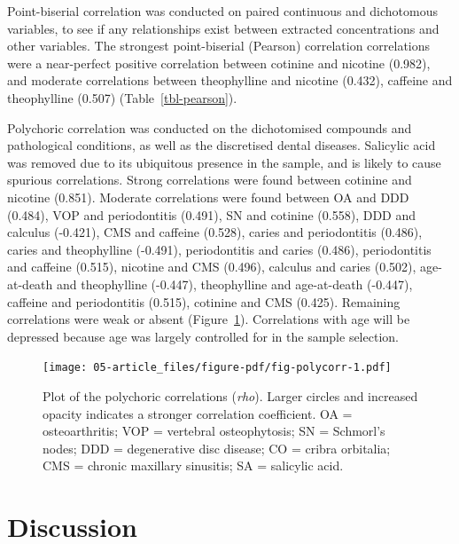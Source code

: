 \documentclass[
  letterpaper,
]{book}
\begin{document}
Point-biserial correlation was conducted on paired continuous and
dichotomous variables, to see if any relationships exist between
extracted concentrations and other variables. The strongest
point-biserial (Pearson) correlation correlations were a near-perfect
positive correlation between cotinine and nicotine (0.982), and moderate
correlations between theophylline and nicotine (0.432), caffeine and
theophylline (0.507) (Table~\ref{tbl-pearson}).

Polychoric correlation was conducted on the dichotomised compounds and
pathological conditions, as well as the discretised dental diseases.
Salicylic acid was removed due to its ubiquitous presence in the sample,
and is likely to cause spurious correlations. Strong correlations were
found between cotinine and nicotine (0.851). Moderate correlations were
found between OA and DDD (0.484), VOP and periodontitis (0.491), SN and
cotinine (0.558), DDD and calculus (-0.421), CMS and caffeine (0.528),
caries and periodontitis (0.486), caries and theophylline (-0.491),
periodontitis and caries (0.486), periodontitis and caffeine (0.515),
nicotine and CMS (0.496), calculus and caries (0.502), age-at-death and
theophylline (-0.447), theophylline and age-at-death (-0.447), caffeine
and periodontitis (0.515), cotinine and CMS (0.425). Remaining
correlations were weak or absent (Figure~\ref{fig-polycorr}).
Correlations with age will be depressed because age was largely
controlled for in the sample selection.

\begin{figure}

{\centering \texttt{[image: 05-article\_files/figure-pdf/fig-polycorr-1.pdf]}

}

\caption{\label{fig-polycorr}Plot of the polychoric correlations
(\emph{rho}). Larger circles and increased opacity indicates a stronger
correlation coefficient. OA = osteoarthritis; VOP = vertebral
osteophytosis; SN = Schmorl's nodes; DDD = degenerative disc disease; CO
= cribra orbitalia; CMS = chronic maxillary sinusitis; SA = salicylic
acid.}

\end{figure}

\hypertarget{discussion-2}{%
\section{Discussion}\label{discussion-2}}
\end{document}
